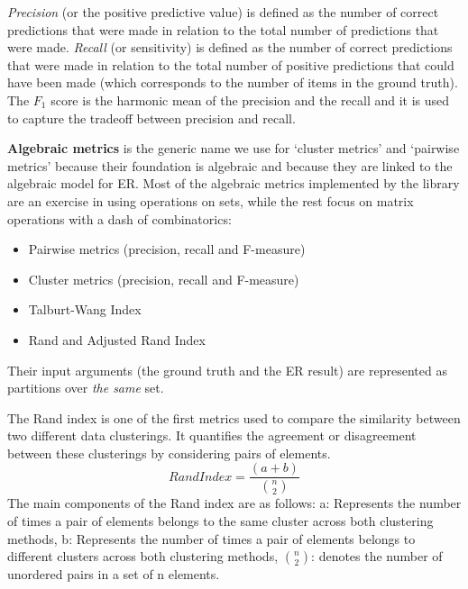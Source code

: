 \documentclass[a4paper,twoside]{article}
\begin{document}
    \textit{Precision} (or the positive predictive value) is defined as the
    number of correct predictions that were made in relation to the total number
    of predictions that were made.
    \textit{Recall} (or sensitivity) is defined as the number of correct
    predictions that were made in relation to the total number of positive
    predictions that could have been made (which corresponds to the number of
    items in the ground truth).
    The \textit{$F_1$} score is the harmonic mean of the precision and the
    recall and it is used to capture the tradeoff between precision and
    recall\cite{hitesh2012}.

    \textbf{Algebraic metrics} is the generic name we use for `cluster metrics'\cite{rand1971,hitesh2012}
    and `pairwise metrics'\cite{hitesh2012,Men10} because their foundation is
    algebraic and because they are linked to the algebraic model for ER.
    Most of the algebraic metrics implemented by the library are an exercise in
    using operations on sets, while the rest focus on matrix operations with a
    dash of combinatorics:
    \begin{itemize}
        \item Pairwise metrics (precision, recall and F-measure)\cite{Men10,hitesh2012}
        \item Cluster metrics (precision, recall and F-measure)\cite{huang2006efficient,hitesh2012}
        \item Talburt-Wang Index\cite{tal2007algebraic}
        \item Rand\cite{rand1971} and Adjusted Rand Index\cite{adjrand1985}
    \end{itemize}
    Their input arguments (the ground truth and the ER result) are represented
    as partitions over \textit{the same} set.
    
    The Rand index is one of the first metrics used to compare the similarity
    between two different data clusterings.
    It quantifies the agreement or disagreement between these clusterings by
    considering pairs of elements.
    \begin{equation}
        Rand Index = \frac{(a + b)}{{\binom{n}{2}}}
    \end{equation}
    The main components of the Rand index are as follows:
    a: Represents the number of times a pair of elements belongs to the
        same cluster across both clustering methods, 
    b: Represents the number of times a pair of elements belongs to
        different clusters across both clustering methods,
    $\binom{n}{2}$: denotes the number of unordered pairs in a set of n
        elements.
   
\end{document}
